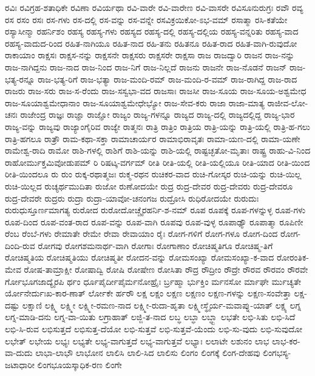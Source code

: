 {ರವಿಃ
ರವಿಗ್ರಹ-ಶತಾಧಿಕೇ
ರವಿಣಾ
ರವಿರ್ಯಥಾ
ರವಿ-ವಾರೇ
ರವಿ-ವಾರೇಣ
ರವಿ-ವಾಸರೇ
ರವಿಸೂನುರುಗ್ರಃ
ರವೌ
ರವ್ಯ
ರಸ
ರಸಂ
ರಸಃ
ರಸ-ಗಳು
ರಸ-ದಲ್ಲಿ
ರಸ-ವನ್ನು
ರಸ-ವನ್ನೇ
ರಸವಿಕ್ರಯಿಕೋ-ಽಭ-ವಮ್
ರಸಾತ್ಮಾ
ರಸಿ-ಕತೆಯೇ
ರಸ್ಯಾಸೀನ್ಮಾ
ರಹರ್ನಿಶಂ
ರಹಸ್ಯ
ರಹಸ್ಯ-ಗಳು
ರಹಸ್ಯದ
ರಹಸ್ಯ-ದಲ್ಲಿ
ರಹಸ್ಯ-ದಲ್ಲಿಯ
ರಹಸ್ಯ-ವನ್ನರಿತು
ರಹಸ್ಯ-ವಾದ
ರಹಸ್ಯ-ವಾದುದ-ರಿಂದ
ರಹಿತ-ನಾಗಿಯೂ
ರಹಿತ-ನಾದ
ರಹಿ-ತನು
ರಹಿತನೂ
ರಹಿತ-ರಾದ
ರಹಿತ-ವಾಗಿ-ರುವುದೋ
ರಾಕಾಯಾಂ
ರಾಕ್ಷಸಃ
ರಾಕ್ಷಸ-ನನ್ನು
ರಾಕ್ಷಸನೇ
ರಾಕ್ಷಸರು
ರಾಕ್ಷಸರೇ
ರಾಕ್ಷಸಾ
ರಾಜ
ರಾಜದ್ವಾರಿ
ರಾಜನ
ರಾಜ-ನನ್ನು
ರಾಜ-ನಾಗಿದ್ದನು
ರಾಜ-ನಾದ
ರಾಜ-ನಿಂದ
ರಾಜ-ನಿಗೆ
ರಾಜ-ನಿಲ್ಲದೆ
ರಾಜನು
ರಾಜನೇ
ರಾಜ-ನೊಡನೆ
ರಾಜನ್
ರಾಜ-ಭತ್ಯ-ರನ್ನೂ
ರಾಜ-ಭತ್ಯ-ರಿಗೆ
ರಾಜ-ಭತ್ಯಾ
ರಾಜ-ಮಂದಿ-ರಮ್
ರಾಜ-ಮಂದಿ-ರ-ವಮ್
ರಾಜ-ರಾಗಿದ್ದ
ರಾಜ-ರಾದ
ರಾಜರು
ರಾಜ-ಸರು
ರಾಜ-ಸ-ರೆಂದು
ರಾಜ-ಸಸ್ವಭಾ-ವದ
ರಾಜಸಾಃ
ರಾಜಸೀ
ರಾಜ-ಸೂಯ
ರಾಜ-ಸೂಯ-ಅಶ್ವಮೇಧ
ರಾಜ-ಸೂಯಾಶ್ವಮೇಧಾನಾಂ
ರಾಜ-ಸೂಯಾಶ್ವಮೇಧೇಭ್ಯೋ
ರಾಜ-ಸೇವ-ಕರು
ರಾಜಾ
ರಾಜಾ-ಮಾತ್ಯ
ರಾಜೀವ-ಲೋ-ಚನಃ
ರಾಜೇಂದ್ರ
ರಾಜ್ಞಃ
ರಾಜ್ಞಾ
ರಾಜ್ಞೋ
ರಾಜ್ಯಂ
ರಾಜ್ಯ-ಗಳನ್ನೂ
ರಾಜ್ಯದ
ರಾಜ್ಯ-ದಲ್ಲಿ
ರಾಜ್ಯದಲ್ಲಿದ್ದ
ರಾಜ್ಯ-ಭಾರ
ರಾಜ್ಯ-ವನ್ನು
ರಾಜ್ಯವು
ರಾಜ್ಯಾಂಗೈರಿವ
ರಾಜ್ಯೇ
ರಾತ್ಮನಃ
ರಾತ್ರಿ
ರಾತ್ರಿಂ
ರಾತ್ರಿಯ
ರಾತ್ರಿ-ಯನ್ನು
ರಾತ್ರಿ-ಯಲ್ಲಿ
ರಾತ್ರಿ-ಹ-ಗಲು
ರಾತ್ರಿ-ಹಗಲೂ
ರಾತ್ರೌ
ರಾಮ-ಕಥಾ-ಸಕ್ತಾ
ರಾಮಾಚಾರ್ಯರ
ರಾಮಾಭಿರಾವೃತಃ
ರಾಮಾ-ಯಣ-ದಲ್ಲಿ
ರಾಮಾ-ಯಣೇ
ರಾಮೇಶ್ವ-ರಾದಿ
ರಾಮೋ
ರಾಶಿ-ಗಳಲ್ಲಿ
ರಾಶಿಗೆ
ರಾಶಿ-ಯನ್ನು
ರಾಶಿ-ಯಲ್ಲಿ
ರಾಷ್ಟಚ್ಛತೋ-ಮೃತಾಃ
ರಾಷ್ಟ್ರ
ರಾಹು-ವಿ-ನಿಂದ
ರಾಹೋರ್ಮುಕ್ತಮಿವೋಡುಪಮ್
ರಿ
ರಿಷಟ್ಕ-ವರ್ಗಮ್
ರೀತಿ
ರೀತಿ-ಯಲ್ಲಿ
ರೀತಿ-ಯಲ್ಲಿಯೂ
ರೀತಿ-ಯಾದ
ರೀತಿ-ಯಿಂದ
ರೀತಿ-ಯಿಂದಲೂ
ರು
ರುಂ
ರುಕ್ಕ-ರಥಾತ್ಮಜಃ
ರುಕ್ಮ-ರಥನ
ರುಚಿಕರ-ವಾದ
ರುಚಿ-ಗೋಸ್ಕರ
ರುಚಿ-ಯನ್ನು
ರುಚಿ-ಯಿಲ್ಲ
ರುಚಿ-ಯಿಲ್ಲದ
ರುಚ್ಯರ್ಥಮುದಿತಾ
ರುಜೋ
ರುಣೋದಯೇ
ರುದ್ರ
ರುದ್ರ-ದೇವರ
ರುದ್ರ-ದೇವರು
ರುದ್ರ-ದೇವರೂ
ರುದ್ರ-ದೇವರೇ
ರುದ್ರರು
ರುದ್ರಾ
ರುದ್ರಾ-ಯಾವೋ-ಚನಂಗಜ
ರುದ್ರೋಸಿ
ರುಧಿರೋದಯೇ
ರುರುದುಃ
ರುರುಧುಸ್ತೂರ್ಣಮಾಗತ್ಯ
ರುರೋದ
ರುರೋದೋಚ್ಚೈರಹರ್ನಿ-ಶ-ನಮ್
ರೂಪ
ರೂಪಕ್ಕೆ
ರೂಪ-ಗಳನ್ನುಳ್ಳ
ರೂಪ-ಗಳು
ರೂಪ-ದಿಂದ
ರೂಪ-ವಂತ-ರಾದ
ರೂಪ-ವನ್ನು
ರೂಪ-ವಾಗಿ
ರೂಪವು
ರೂಪ-ವುಳ್ಳ
ರೂಪಾಢ್ಯೌ
ರೂಪಾತ್ಮಾ
ರೂಪಿಣೀ
ರೆಂಬ
ರೆಂಬೆ-ಗಳು
ರೇಮಾತೇ
ರೇಮೇ
ರೇವಾ
ರೇವಾಯಾಂ
ರೈಃ
ರೋಗ-ಗಳಿಗೆ
ರೋಗ-ಗಳೂ
ರೋಗ-ದಿಂದ
ರೋಗ-ದಿಂದಿ-ರುವ
ರೋಗವು
ರೋಗಶಮನಾರ್ಥ-ವಾಗಿ
ರೋಗಾಃ
ರೋಗಾಣಾಂ
ರೋಚಿಷ್ಮತಿಗೂ
ರೋಚಿಷ್ಮ-ತಿಗೆ
ರೋಚಿಷ್ಮತಿಯ
ರೋಚಿಷ್ಮತಿಯು
ರೋಚಿಷ್ಮತೀ
ರೋದನ-ವನ್ನು
ರೋಮಸಂಖ್ಯಾ
ರೋಮಸಂಖ್ಯಾ-ಕ-ವಾದ
ರೋರಂತಿಕ-ಮೇವ
ರೋಷ-ತಾಮ್ರಾಕ್ಷೀ
ರೋಷಾದ್ವಿ
ರೋಷಿ
ರೋಷೇಣ
ರೋಸಿತಾ
ರೌದ್ರ
ರೌದ್ರೀಂ
ರೌದ್ರೇ
ರೌರವ
ರೌರವಂ
ರೌರವೇ
ರ್ಗೋಭೂಗಜಾದ್ಯೈರಪಿ
ರ್ಥಂ
ರ್ಧೂಪೈರ್ದೀಪೈರ್ಮನೋಹ್ರೈಃ
ರ್ಬ್ರಹ್ಮಾ
ರ್ಭುಕ್ತಿಂ
ರ್ಮನಸೋ
ರ್ಮಾಘೇ
ರ್ಮುಚ್ಯತೇ
ರ್ಯೋನೇರ್ದುಃಖ-ಕಾರ-ಣಾತ್
ರ್ಲೋಕೇ
ರ್ಹರೌ
ಲಕ್ಷ
ಲಕ್ಷಂ
ಲಕ್ಷಣ
ಲಕ್ಷಣಂ
ಲಕ್ಷಣ-ಗಳನ್ನು
ಲಕ್ಷಣ-ಸಂವೇತ್ತಾ
ಲಕ್ಷ-ದಷ್ಟು
ಲಕ್ಷಾಣಿ
ಲಕ್ಷ್ಮಿ
ಲಕ್ಷ್ಮೀ
ಲಕ್ಷ್ಮೀ-ರಮಣ-ನಾದ
ಲಕ್ಷ್ಮೀ-ರುದಾ-ಹೃತಾ
ಲಕ್ಷ್ಮೀಸ್ಥೈರ್ಯ-ಮವಾಪ್ನು-ಯಾತ್
ಲಕ್ಷ್ಯ
ಲಗ್ನ
ಲಗ್ನ-ಮಾಡಿ-ದನು
ಲಗ್ನ-ವಾ-ಯಿತು
ಲಗ್ರಾಹಾತ್
ಲಜ್ಜಿ-ತ-ನಾದ
ಲಬ್ಧ
ಲಬ್ಧಾ
ಲಬ್ಧ್ಬಾ
ಲಭತೇ
ಲಭಿ-ಸಿತು
ಲಭಿ-ಸಿದೆ
ಲಭಿ-ಸಿ-ರುವ
ಲಭಿಸುತ್ತದೆ
ಲಭಿಸುತ್ತ-ದೆಯೋ
ಲಭಿ-ಸುತ್ತವೆ
ಲಭಿ-ಸುತ್ತವೆ-ಯೆಂದು
ಲಭಿ-ಸು-ವುದು
ಲಭಿ-ಸುವುದೋ
ಲಭೇತ್
ಲಭೇಯ
ಲಭ್ಯಃ
ಲಭ್ಯತೇ
ಲಭ್ಯ-ವಾಗುತ್ತದೆ
ಲಭ್ಯ-ವಾಗುತ್ತವೆ
ಲಭ್ಯಾಃ
ಲಲಾಟೇ
ಲಶುನಂ
ಲಾಭ
ಲಾಭ-ಕರ-ವಾ-ದುದು
ಲಾಭಾ-ಲಾಭೌ
ಲಾಭೋನ
ಲಾಲಿಸಿ
ಲಾಲಿ-ಸಿದ
ಲಾಲಿಸು
ಲಿಂಗಂ
ಲಿಂಗಕ್ಕೆ
ಲಿಂಗ-ದೇಹವು
ಲಿಂಗಭಸ್ಯ-ಜಟಾಧಾರೀ
ಲಿಂಗಭೂಯಸ್ಕಾಧಿಕ-ರಣ
ಲಿಂಗೇ
}
